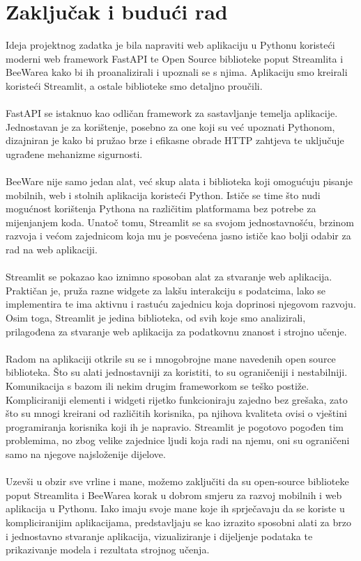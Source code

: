 \chapter{Zaključak i budući rad}

		Ideja projektnog zadatka je bila napraviti web aplikaciju u Pythonu koristeći moderni web framework FastAPI te Open Source biblioteke poput Streamlita i BeeWarea kako bi ih proanalizirali i upoznali se s njima. Aplikaciju smo kreirali koristeći Streamlit, a ostale biblioteke smo detaljno proučili.
		\\ \\
		FastAPI se istaknuo kao odličan framework za sastavljanje temelja aplikacije. Jednostavan je za korištenje, posebno za one koji su već upoznati Pythonom, dizajniran je kako bi pružao brze i efikasne obrade HTTP zahtjeva te uključuje ugrađene mehanizme sigurnosti.
		\\ \\
		BeeWare nije samo jedan alat, već skup alata i biblioteka koji omogućuju pisanje mobilnih, web i stolnih aplikacija koristeći Python. Ističe se time što nudi mogućnost korištenja Pythona na različitim platformama bez potrebe za mijenjanjem koda. Unatoč tomu, Streamlit se sa svojom jednostavnošću, brzinom razvoja i većom zajednicom koja mu je posvećena jasno ističe kao bolji odabir za rad na web aplikaciji.
		\\ \\
		Streamlit se pokazao kao iznimno sposoban alat za stvaranje web aplikacija. Praktičan je, pruža razne widgete za lakšu interakciju s podatcima, lako se implementira te ima aktivnu i rastuću zajednicu koja doprinosi njegovom razvoju. Osim toga, Streamlit je jedina biblioteka, od svih koje smo analizirali, prilagođena za stvaranje web aplikacija za podatkovnu znanost i strojno učenje.
		\\ \\
		Radom na aplikaciji otkrile su se i mnogobrojne mane navedenih open source biblioteka. Što su alati jednostavniji za koristiti, to su ograničeniji i nestabilniji. Komunikacija s bazom ili nekim drugim frameworkom se teško postiže. Kompliciraniji elementi i widgeti rijetko funkcioniraju zajedno bez grešaka, zato što su mnogi kreirani od različitih korisnika, pa njihova kvaliteta ovisi o vještini programiranja korisnika koji ih je napravio. Streamlit je pogotovo pogođen tim problemima, no zbog velike zajednice ljudi koja radi na njemu, oni su ograničeni samo na njegove najsloženije dijelove.
		\\ \\
		Uzevši u obzir sve vrline i mane, možemo zaključiti da su open-source biblioteke poput Streamlita i BeeWarea korak u dobrom smjeru za razvoj mobilnih i web aplikacija u Pythonu. Iako imaju svoje mane koje ih sprječavaju da se koriste u kompliciranijim aplikacijama, predstavljaju se kao izrazito sposobni alati za brzo i jednostavno stvaranje aplikacija, vizualiziranje i dijeljenje podataka te prikazivanje modela i rezultata strojnog učenja.
		
		 \eject
